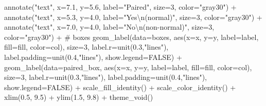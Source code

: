 \documentclass[
  12pt,
  letterpaper,
]{book}
\newenvironment{Shaded}{\begin{snugshade}}{\end{snugshade}}
\newcommand{\AttributeTok}[1]{\textcolor[rgb]{0.40,0.45,0.13}{#1}}
\newcommand{\CommentTok}[1]{\textcolor[rgb]{0.37,0.37,0.37}{#1}}
\newcommand{\ConstantTok}[1]{\textcolor[rgb]{0.56,0.35,0.01}{#1}}
\newcommand{\DecValTok}[1]{\textcolor[rgb]{0.68,0.00,0.00}{#1}}
\newcommand{\FloatTok}[1]{\textcolor[rgb]{0.68,0.00,0.00}{#1}}
\newcommand{\FunctionTok}[1]{\textcolor[rgb]{0.28,0.35,0.67}{#1}}
\newcommand{\NormalTok}[1]{\textcolor[rgb]{0.00,0.23,0.31}{#1}}
\newcommand{\SpecialCharTok}[1]{\textcolor[rgb]{0.37,0.37,0.37}{#1}}
\newcommand{\StringTok}[1]{\textcolor[rgb]{0.13,0.47,0.30}{#1}}
\begin{document}
\begin{Shaded}
\begin{Highlighting}[]
  \FunctionTok{annotate}\NormalTok{(}\StringTok{"text"}\NormalTok{, }\AttributeTok{x=}\FloatTok{7.1}\NormalTok{, }\AttributeTok{y=}\FloatTok{5.6}\NormalTok{, }\AttributeTok{label=}\StringTok{"Paired"}\NormalTok{, }\AttributeTok{size=}\DecValTok{3}\NormalTok{, }\AttributeTok{color=}\StringTok{"gray30"}\NormalTok{) }\SpecialCharTok{+}
  \FunctionTok{annotate}\NormalTok{(}\StringTok{"text"}\NormalTok{, }\AttributeTok{x=}\FloatTok{5.3}\NormalTok{, }\AttributeTok{y=}\FloatTok{4.0}\NormalTok{, }\AttributeTok{label=}\StringTok{"Yes}\SpecialCharTok{\textbackslash{}n}\StringTok{(normal)"}\NormalTok{, }\AttributeTok{size=}\DecValTok{3}\NormalTok{, }\AttributeTok{color=}\StringTok{"gray30"}\NormalTok{) }\SpecialCharTok{+}
  \FunctionTok{annotate}\NormalTok{(}\StringTok{"text"}\NormalTok{, }\AttributeTok{x=}\FloatTok{7.0}\NormalTok{, }\AttributeTok{y=}\FloatTok{4.0}\NormalTok{, }\AttributeTok{label=}\StringTok{"No}\SpecialCharTok{\textbackslash{}n}\StringTok{(non{-}normal)"}\NormalTok{, }\AttributeTok{size=}\DecValTok{3}\NormalTok{, }\AttributeTok{color=}\StringTok{"gray30"}\NormalTok{) }\SpecialCharTok{+}
  \CommentTok{\# boxes}
  \FunctionTok{geom\_label}\NormalTok{(}\AttributeTok{data=}\NormalTok{boxes,}
             \FunctionTok{aes}\NormalTok{(}\AttributeTok{x=}\NormalTok{x, }\AttributeTok{y=}\NormalTok{y, }\AttributeTok{label=}\NormalTok{label, }\AttributeTok{fill=}\NormalTok{fill, }\AttributeTok{color=}\NormalTok{col),}
             \AttributeTok{size=}\DecValTok{3}\NormalTok{, }\AttributeTok{label.r=}\FunctionTok{unit}\NormalTok{(}\FloatTok{0.3}\NormalTok{,}\StringTok{"lines"}\NormalTok{),}
             \AttributeTok{label.padding=}\FunctionTok{unit}\NormalTok{(}\FloatTok{0.4}\NormalTok{,}\StringTok{"lines"}\NormalTok{), }\AttributeTok{show.legend=}\ConstantTok{FALSE}\NormalTok{) }\SpecialCharTok{+}
  \FunctionTok{geom\_label}\NormalTok{(}\AttributeTok{data=}\NormalTok{paired\_box,}
             \FunctionTok{aes}\NormalTok{(}\AttributeTok{x=}\NormalTok{x, }\AttributeTok{y=}\NormalTok{y, }\AttributeTok{label=}\NormalTok{label, }\AttributeTok{fill=}\NormalTok{fill, }\AttributeTok{color=}\NormalTok{col),}
             \AttributeTok{size=}\DecValTok{3}\NormalTok{, }\AttributeTok{label.r=}\FunctionTok{unit}\NormalTok{(}\FloatTok{0.3}\NormalTok{,}\StringTok{"lines"}\NormalTok{),}
             \AttributeTok{label.padding=}\FunctionTok{unit}\NormalTok{(}\FloatTok{0.4}\NormalTok{,}\StringTok{"lines"}\NormalTok{), }\AttributeTok{show.legend=}\ConstantTok{FALSE}\NormalTok{) }\SpecialCharTok{+}
  \FunctionTok{scale\_fill\_identity}\NormalTok{() }\SpecialCharTok{+}
  \FunctionTok{scale\_color\_identity}\NormalTok{() }\SpecialCharTok{+}
  \FunctionTok{xlim}\NormalTok{(}\FloatTok{0.5}\NormalTok{, }\FloatTok{9.5}\NormalTok{) }\SpecialCharTok{+} \FunctionTok{ylim}\NormalTok{(}\FloatTok{1.5}\NormalTok{, }\FloatTok{9.8}\NormalTok{) }\SpecialCharTok{+}
  \FunctionTok{theme\_void}\NormalTok{()}
\end{Highlighting}
\end{Shaded}
\end{document}

